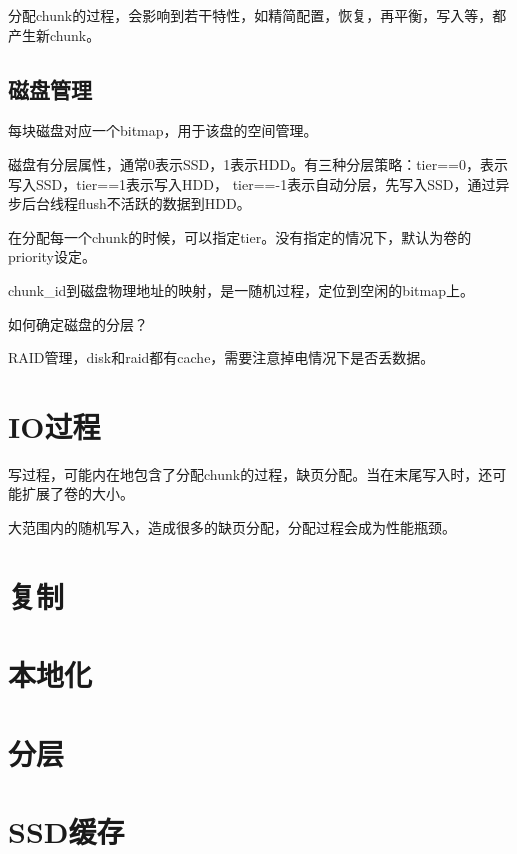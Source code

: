 分配chunk的过程，会影响到若干特性，如精简配置，恢复，再平衡，写入等，都产生新chunk。

\subsection{磁盘管理}

每块磁盘对应一个bitmap，用于该盘的空间管理。

磁盘有分层属性，通常0表示SSD，1表示HDD。有三种分层策略：tier==0，表示写入SSD，tier==1表示写入HDD，
tier==-1表示自动分层，先写入SSD，通过异步后台线程flush不活跃的数据到HDD。

在分配每一个chunk的时候，可以指定tier。没有指定的情况下，默认为卷的priority设定。

chunk\_id到磁盘物理地址的映射，是一随机过程，定位到空闲的bitmap上。

如何确定磁盘的分层？

RAID管理，disk和raid都有cache，需要注意掉电情况下是否丢数据。

\section{IO过程}

写过程，可能内在地包含了分配chunk的过程，缺页分配。当在末尾写入时，还可能扩展了卷的大小。

大范围内的随机写入，造成很多的缺页分配，分配过程会成为性能瓶颈。

\section{复制}
\section{本地化}
\section{分层}
\section{SSD缓存}
